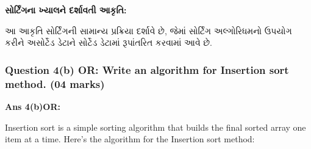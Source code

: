 \textbf{સોર્ટિંગના ખ્યાલને દર્શાવતી આકૃતિ:}

\begin{Shaded}
\begin{Highlighting}[]
\end{Highlighting}
\end{Shaded}

આ આકૃતિ સોર્ટિંગની સામાન્ય પ્રક્રિયા દર્શાવે છે, જેમાં સોર્ટિંગ અલ્ગોરિધમનો ઉપયોગ કરીને
અસોર્ટેડ ડેટાને સોર્ટેડ ડેટામાં રૂપાંતરિત કરવામાં આવે છે.

\hypertarget{question-4b-or-write-an-algorithm-for-insertion-sort-method.-04-marks}{%
\subsubsection{Question 4(b) OR: Write an algorithm for Insertion sort
method. (04
marks)}\label{question-4b-or-write-an-algorithm-for-insertion-sort-method.-04-marks}}

\textbf{Ans 4(b)OR:}

Insertion sort is a simple sorting algorithm that builds the final
sorted array one item at a time. Here's the algorithm for the Insertion
sort method:

